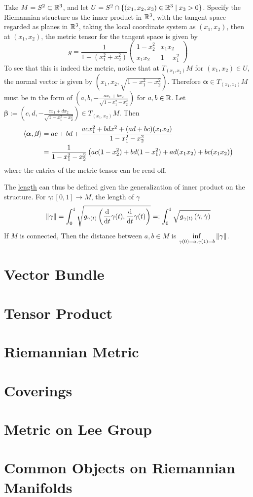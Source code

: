 \documentclass{article}
\begin{document}
\begin{example}
    Take $M = S^2 \subset \mathbb{R}^3$, and let $U = S^2 \cap \{ (x_1, x_2, x_3) \in \mathbb{R}^3 \mid x_3 > 0 \}$. Specify the Riemannian structure as the inner product in $\mathbb{R}^3$, with the tangent space regarded as planes in $\mathbb{R}^3$, taking the local coordinate system as $(x_1, x_2)$, then at $(x_1, x_2)$, the metric tensor for the tangent space is given by
    \[
        g = \frac{1}{1- (x_1^2 + x_2^2)} \begin{pmatrix}
            1 - x_2^2 & x_1 x_2 \\
            x_1 x_2 & 1 - x_1^2
        \end{pmatrix}
    \]
    To see that this is indeed the metric, notice that at $T_{(x_1, x_2)} M$ for $(x_1, x_2) \in U$, the normal vector is given by $(x_1, x_2, \sqrt{1 - x_1^2 - x_2^2})$. Therefore $\bm{\alpha} \in T_{(x_1, x_2)}M$ must be in the form of $(a, b, -\frac{a x_1 + b x_2}{\sqrt{1 - x_1^2 - x_2^2}})$ for $a, b \in \mathbb{R}$. Let $\bm{\beta} := (c, d, -\frac{c x_1 + d x_2}{\sqrt{1 - x_1^2 - x_2^2}}) \in T_{(x_1, x_2)} M$. Then
    \begin{align*}
        \left\langle \bm{\alpha}, \bm{\beta} \right\rangle 
        & = ac + bd + \frac{ac x_1^2 + bd x^2 + (ad + bc)(x_1 x_2)}{1 - x_1^2 - x_2^2} \\
        & = \frac{1}{1 - x_1^2 - x_2^2} \left( ac(1 - x_2^2) + bd(1 - x_1^2) + ad(x_1 x_2) + bc(x_1 x_2) \right)
    \end{align*}
    where the entries of the metric tensor can be read off. 
\end{example}

\begin{observation}
    The \underline{length} can thus be defined given the generalization of inner product on the structure. For $\gamma: [0, 1] \to M$, the length of $\gamma$
    \[
        \left\|\gamma\right\| = \int_{0}^{1} \sqrt{g_{\gamma(t)} \left(\frac{\mathrm{d} }{\mathrm{d} t}{\gamma(t)}, \frac{\mathrm{d} }{\mathrm{d} t}{\gamma(t)}\right)} =: \int_{0}^{1} \sqrt{g_{\gamma(t)} \left(\dot{\gamma}, \dot{\gamma}\right)} 
    \]
    If $M$ is connected, Then the distance between $a, b \in M$ is $\inf\limits_{\gamma(0) = a, \gamma(1) = b} \left\|\gamma\right\|$.
\end{observation}

\section{Vector Bundle}

\section{Tensor Product}

\section{Riemannian Metric}

\section{Coverings}

\section{Metric on Lee Group}

\section{Common Objects on Riemannian Manifolds}
\end{document}
